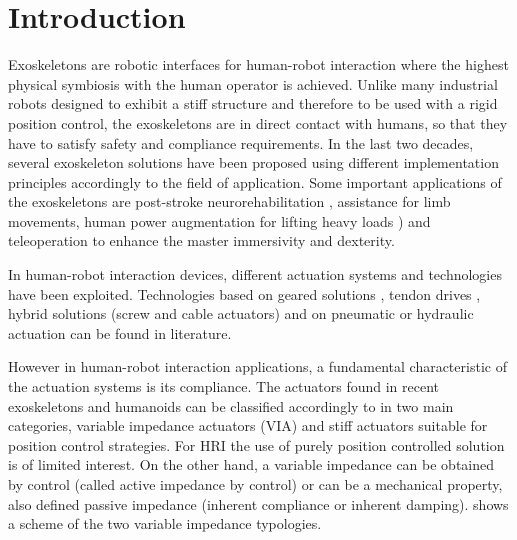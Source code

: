 \section{Introduction}

Exoskeletons are robotic interfaces for human-robot interaction where the highest physical symbiosis with the human operator is achieved.
Unlike many industrial robots  designed to exhibit a stiff structure and therefore to be used with a rigid position control, the exoskeletons are in direct contact with humans, so that  they have to satisfy  safety and compliance requirements.
In the last two decades, several exoskeleton solutions have been proposed using different implementation principles accordingly to the field of application.
Some important applications of the exoskeletons are post-stroke neurorehabilitation \cite{lo2012exoskeleton,pirondini2016evaluation}, assistance for limb movements, human power augmentation for lifting  heavy loads \cite{kim2016powered}) and teleoperation \cite{buongiorno2018wres, rebelo2014bilateral} to enhance the master immersivity and dexterity.
%
\par In human-robot interaction devices, different actuation systems and technologies have been exploited.
Technologies based on geared solutions \cite{mihelj2007armin,vertechy2009development,carignan2005design}, tendon drives \cite{frisoli2009force,perry2007upper}, hybrid solutions (screw and cable actuators) \cite{garrec2008able} and  on pneumatic or hydraulic  actuation \cite{tsagarakis2003development,klein2010optimization} can be found in literature.
\par However in human-robot interaction applications, a fundamental characteristic of the actuation systems is its compliance. The actuators found in recent exoskeletons and humanoids can be classified accordingly to \cite{vanderborght2013variable} in two main categories, variable impedance actuators (VIA) and stiff actuators suitable for position control strategies. For HRI the use of purely position controlled solution is of limited interest. On the other hand, a variable impedance can be obtained by control (called active impedance by control) or can be a mechanical property, also defined passive impedance (inherent compliance or inherent damping).  shows a scheme of the two variable impedance typologies.
%
